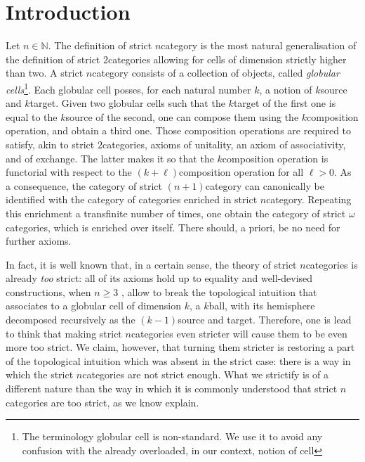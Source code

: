 \section{Introduction}

Let \( n \in \mathbb{N} \).
The definition of strict \( n \)\nbd category is the most natural generalisation of the definition of strict \( 2 \)\nbd categories allowing for cells of dimension strictly higher than two.
A strict \( n \)\nbd category \cite{brown1981groupoids} consists of a collection of objects, called \emph{globular cells}\footnote{The terminology globular cell is non-standard. We use it to avoid any confusion with the already overloaded, in our context, notion of cell}.
Each globular cell posses, for each natural number \( k \), a notion of \( k \)\nbd source and \( k \)\nbd target. 
Given two globular cells such that the \( k \)\nbd target of the first one is equal to the \( k \)\nbd source of the second, one can compose them using the \( k \)\nbd composition operation, and obtain a third one.
Those composition operations are required to satisfy, akin to strict \( 2 \)\nbd categories, axioms of unitality, an axiom of associativity, and of exchange.
The latter makes it so that the \( k \)\nbd composition operation is functorial with respect to the \( (k + \ell) \)\nbd composition operation for all \( \ell > 0 \).
As a consequence, the category of strict \( (n + 1) \)\nbd category can canonically be identified with the category of categories enriched in strict \( n \)\nbd category. 
Repeating this enrichment a transfinite number of times, one obtain the category of strict \( \omega \)\nbd categories, which is enriched over itself.
There should, a priori, be no need for further axioms.   

In fact, it is well known that, in a certain sense, the theory of strict \( n \)\nbd categories is already \emph{too} strict: all of its axioms hold up to equality and well-devised constructions, when \( n \geq 3 \) \cite{simpson1998homotopy}, allow to break the topological intuition that associates to a globular cell of dimension \( k \), a \( k \)\nbd ball, with its hemisphere decomposed recursively as the \( (k - 1) \)\nbd source and target.
Therefore, one is lead to think that making strict \( n \)\nbd categories even stricter will cause them to be even more too strict.
We claim, however, that turning them stricter is restoring a part of the topological intuition which was absent in the strict case: there is a way in which the strict \( n \)\nbd categories are not strict enough.
What we strictify is of a different nature than the way in which it is commonly understood that strict \( n \)\nbd categories are too strict, as we know explain.

